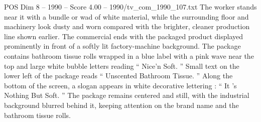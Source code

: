 \begin{textsample}{POS Dim 8 – 1990 – Score 4.00 – 1990/tv\_com\_1990\_107.txt}
The worker stands near it with a bundle or wad of white material, while the surrounding floor and machinery look dusty and worn compared with the brighter, cleaner production line shown earlier.
The commercial ends with the packaged product displayed prominently in front of a softly lit factory-machine background.
The package contains bathroom tissue rolls wrapped in a blue label with a pink wave near the top and large white bubble letters reading “ Nice’n Soft. ” Small text on the lower left of the package reads “ Unscented Bathroom Tissue. ” Along the bottom of the screen, a slogan appears in white decorative lettering : “ It ’s Nothing But Soft. ” The package remains centered and still, with the industrial background blurred behind it, keeping attention on the brand name and the bathroom tissue rolls.

\end{textsample}
